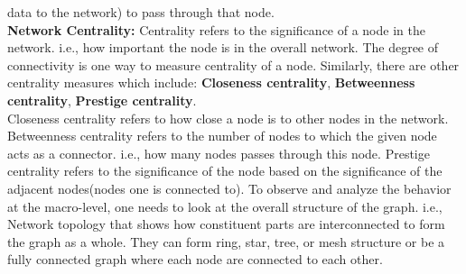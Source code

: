 data to the network) to pass through that node.\\
\textbf{Network Centrality:} Centrality refers to the significance of a node in
the network. i.e., how important the node is in the overall network. The degree
of connectivity is one way to measure centrality of a node. Similarly, there
are other centrality measures which include: \textbf{Closeness centrality},
\textbf{Betweenness centrality}, \textbf{Prestige centrality}.\\ 
Closeness centrality refers to how close a node is to other nodes in the network.
Betweenness centrality refers to the number of nodes to which the given node
acts as a connector. i.e., how many nodes passes through this node.  Prestige
centrality refers to the significance of the node based on the significance of
the adjacent nodes(nodes one is connected to).
To observe and analyze the behavior at the macro-level, one needs to look at
the overall structure of the graph. i.e., Network topology that shows how
constituent parts are interconnected to form the graph as a whole. They can
form ring, star, tree, or mesh structure or be a fully connected graph where
each node are connected to each other. 

